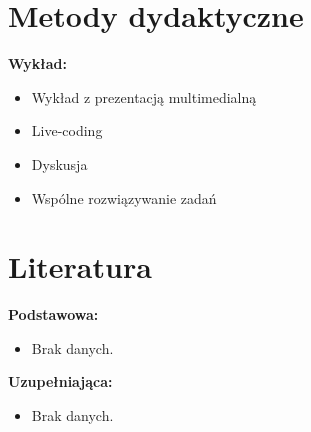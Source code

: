 \documentclass[12pt, a4paper]{article}
\begin{document}
\section{Metody dydaktyczne}

\textbf{Wykład:}
\begin{itemize}
  \item Wykład z prezentacją multimedialną
  \item Live-coding
  \item Dyskusja
  \item Wspólne rozwiązywanie zadań
\end{itemize}
\vspace{4pt}


\section{Literatura}

\textbf{Podstawowa:}
\begin{itemize}
  \item Brak danych.
\end{itemize}

\textbf{Uzupełniająca:}
\begin{itemize}
  \item Brak danych.
\end{itemize}
\end{document}
